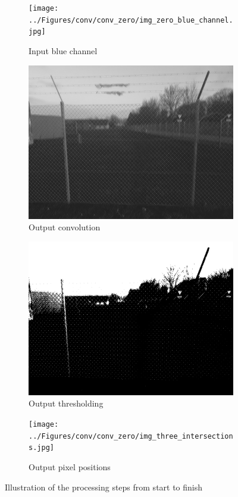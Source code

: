 \documentclass[../Head/Main.tex]{subfiles}
\begin{document}
\begin{figure}[H]
    \centering
    \begin{subfigure}{0.24\textwidth}
        \centering
        \texttt{[image: ../Figures/conv/conv\_zero/img\_zero\_blue\_channel.jpg]}
        \caption{Input blue channel}
        \label{fig:conv_tst0_blue}
    \end{subfigure}
    \hfill
    \begin{subfigure}{0.24\textwidth}
        \centering
        \includegraphics[width=\textwidth]{../Figures/conv/conv_zero/img_one_conv.jpg}
        \caption{Output convolution}
        \label{fig:conv_tst0_conv}
    \end{subfigure}
    \hfill
    \begin{subfigure}{0.24\textwidth}
        \centering
        \includegraphics[width=\textwidth]{../Figures/conv/conv_zero/img_two_threshold.jpg}
        \caption{Output thresholding}
        \label{fig:conv_tst0_thresh}
    \end{subfigure}
    \hfill
    \begin{subfigure}{0.24\textwidth}
        \centering
        \texttt{[image: ../Figures/conv/conv\_zero/img\_three\_intersections.jpg]}
        \caption{Output pixel positions}
        \label{fig:conv_tst0_px_pos}
    \end{subfigure}
    \caption{Illustration of the processing steps from start to finish}
    \label{fig:conv_tst0}
\end{figure}
\end{document}
